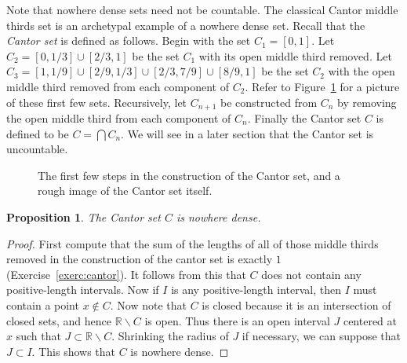 \documentclass[11pt,oneside]{amsbook}
\newcommand{\RR}{\mathbb R}
\theoremstyle{definition}
\theoremstyle{plain}
\newtheorem{prop}[thm]{Proposition}
\theoremstyle{definition}
\theoremstyle{remark}
\begin{document}
Note that nowhere dense sets need not be countable. The classical Cantor middle thirds set is an archetypal example of a nowhere dense set. Recall that the \emph{Cantor set} is defined as follows. Begin with the set $C_1=[0,1]$. Let $C_2=[0,1/3]\cup[2/3,1]$ be the set $C_1$ with its open middle third removed. Let $C_3=[1,1/9]\cup[2/9,1/3]\cup[2/3,7/9]\cup[8/9,1]$ be the set $C_2$ with the open middle third removed from each component of $C_2$. Refer to Figure~\ref{fig:cantor-set} for a picture of these first few sets. Recursively, let $C_{n+1}$ be constructed from $C_n$ by removing the open middle third from each component of $C_n$. Finally the Cantor set $C$ is defined to be $C=\bigcap C_n$. We will see in a later section that the Cantor set is uncountable. %

\begin{figure}[h]
\begin{center}
\end{center}
\caption{The first few steps in the construction of the Cantor set, and a rough image of the Cantor set itself.\label{fig:cantor-set}}
\end{figure}

\begin{prop}
  The Cantor set $C$ is nowhere dense.
\end{prop}

\begin{proof}
  First compute that the sum of the lengths of all of those middle thirds removed in the construction of the cantor set is exactly $1$ (Exercise~\ref{exerc:cantor}). It follows from this that $C$ does not contain any positive-length intervals. Now if $I$ is any positive-length interval, then $I$ must contain a point $x\notin C$. Now note that $C$ is closed because it is an intersection of closed sets, and hence $\RR\smallsetminus C$ is open. Thus there is an open interval $J$ centered at $x$ such that $J\subset\RR\smallsetminus C$. Shrinking the radius of $J$ if necessary, we can suppose that $J\subset I$. This shows that $C$ is nowhere dense.
\end{proof}
\end{document}
